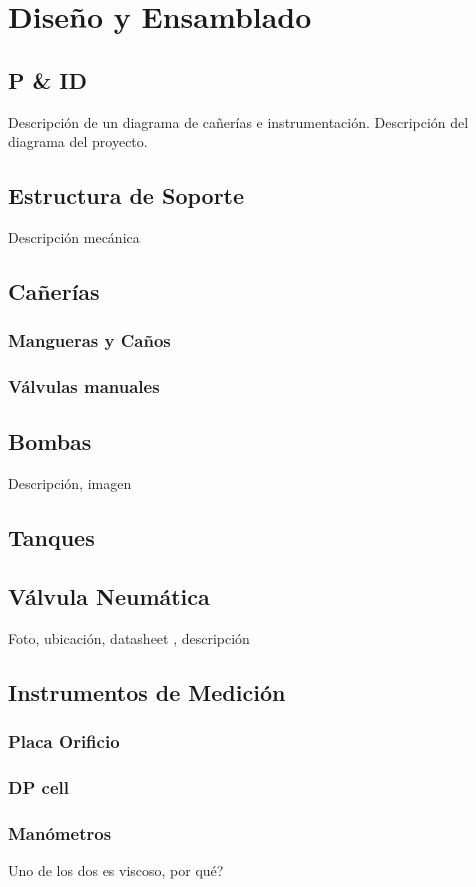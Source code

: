 \chapter{Diseño y Ensamblado}
\label{ch:DisenoEnsamblado}

\section{P \& ID}
\label{sec:p&id}
Descripción de un diagrama de cañerías e instrumentación. 
Descripción del diagrama del proyecto.

\section{Estructura de Soporte}
\label{sec:EstructuraSoporte}
Descripción mecánica

\section{Cañerías}
\label{sec:Canerias}
\subsection{Mangueras y Caños}
\subsection{Válvulas manuales}

\section{Bombas}
\label{sec:Bombas}
Descripción, imagen

\section{Tanques}
\label{sec:Tanques}

\section{Válvula Neumática}
\label{sec:ValvulaNeumatica}
Foto, ubicación, datasheet , descripción

\section{Instrumentos de Medición}
\label{sec:InstrumentosMedicion}
\subsection{Placa Orificio}
\label{subsec:PlacaOrificio}

\subsection{DP cell}
\label{subsec:DPCell}

\subsection{Manómetros}
\label{subsec:Manometros}
Uno de los dos es viscoso, por qué? 
